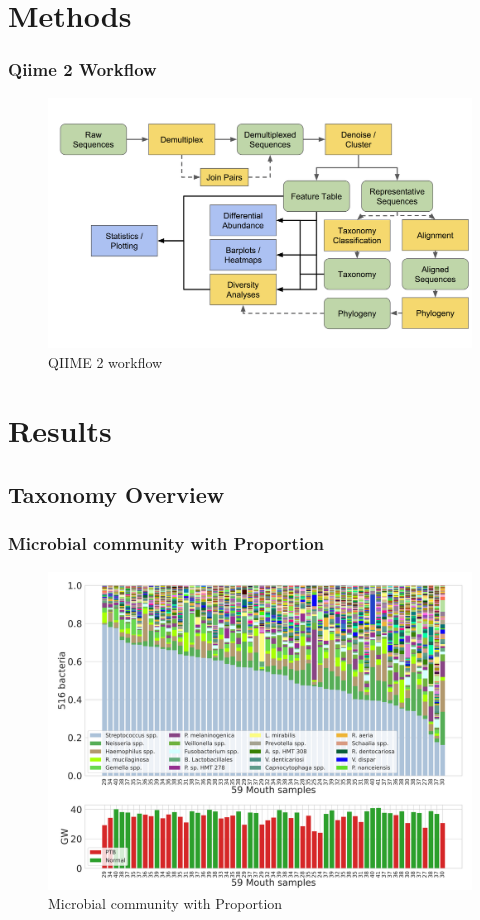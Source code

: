 \documentclass{beamer}
\begin{document}
    \section{Methods}
    \begin{frame}
        \frametitle{Qiime 2 Workflow}

        \begin{figure}
            \includegraphics[width=0.8 \linewidth]{figures/qiime.png}
            \caption{QIIME 2 workflow \protect\cite{qiime1, qiime2, qiime3}}
        \end{figure}
    \end{frame}

    \section{Results}
    \subsection{Taxonomy Overview}
    \begin{frame}
        \frametitle{Microbial community with Proportion}

        \begin{figure}
            \includegraphics[width=0.7 \linewidth]{figures/Step60_Proportion/singleton.DADA2.homd.uncorrected/Mouth.pdf}
            \caption{Microbial community with Proportion}
        \end{figure}
    \end{frame}
\end{document}
